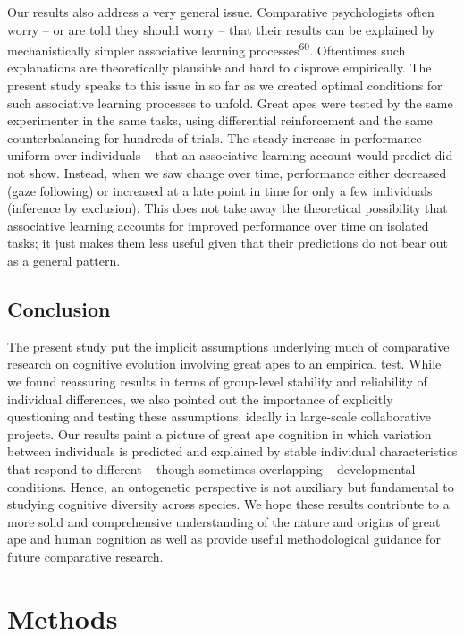 \documentclass[
  man,floatsintext]{apa6}
\begin{document}
Our results also address a very general issue. Comparative psychologists often worry -- or are told they should worry -- that their results can be explained by mechanistically simpler associative learning processes\textsuperscript{60}. Oftentimes such explanations are theoretically plausible and hard to disprove empirically. The present study speaks to this issue in so far as we created optimal conditions for such associative learning processes to unfold. Great apes were tested by the same experimenter in the same tasks, using differential reinforcement and the same counterbalancing for hundreds of trials. The steady increase in performance -- uniform over individuals -- that an associative learning account would predict did not show. Instead, when we saw change over time, performance either decreased (gaze following) or increased at a late point in time for only a few individuals (inference by exclusion). This does not take away the theoretical possibility that associative learning accounts for improved performance over time on isolated tasks; it just makes them less useful given that their predictions do not bear out as a general pattern.

\hypertarget{conclusion}{%
\subsection{Conclusion}\label{conclusion}}

The present study put the implicit assumptions underlying much of comparative research on cognitive evolution involving great apes to an empirical test. While we found reassuring results in terms of group-level stability and reliability of individual differences, we also pointed out the importance of explicitly questioning and testing these assumptions, ideally in large-scale collaborative projects. Our results paint a picture of great ape cognition in which variation between individuals is predicted and explained by stable individual characteristics that respond to different -- though sometimes overlapping -- developmental conditions. Hence, an ontogenetic perspective is not auxiliary but fundamental to studying cognitive diversity across species. We hope these results contribute to a more solid and comprehensive understanding of the nature and origins of great ape and human cognition as well as provide useful methodological guidance for future comparative research.

\hypertarget{methods}{%
\section{Methods}\label{methods}}
\end{document}

